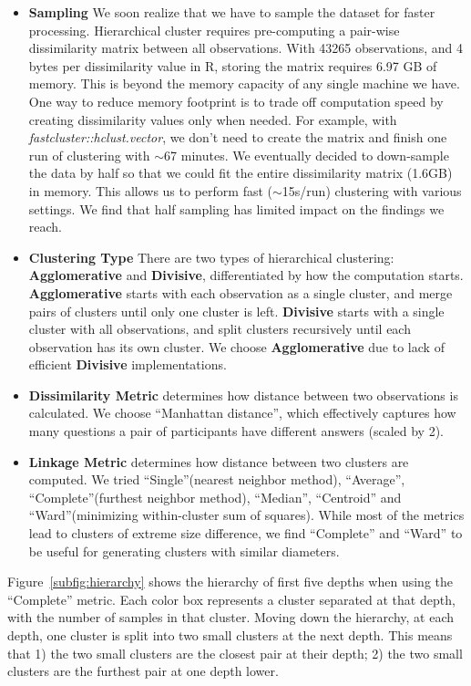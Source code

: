 \begin{itemize}
\item \textbf{Sampling} We soon realize that we have to sample the dataset for faster processing. Hierarchical cluster requires pre-computing a pair-wise dissimilarity matrix between all observations. With 43265 observations, and 4 bytes per dissimilarity value in R, storing the matrix requires 6.97 GB of memory. This is beyond the memory capacity of any single machine we have. One way to reduce memory footprint is to trade off computation speed by creating dissimilarity values only when needed. For example, with {\it fastcluster::hclust.vector}, we don't need to create the matrix and finish one run of clustering with $\sim$67 minutes. We eventually decided to down-sample the data by half so that we could fit the entire dissimilarity matrix (1.6GB) in memory. This allows us to perform fast ($\sim$15s/run) clustering with various settings. We find that half sampling has limited impact on the findings we reach.

\item \textbf{Clustering Type} There are two types of hierarchical clustering: \textbf{Agglomerative} and \textbf{Divisive}, differentiated by how the computation starts. \textbf{Agglomerative} starts with each observation as a single cluster, and merge pairs of clusters until only one cluster is left. \textbf{Divisive} starts with a single cluster with all observations, and split clusters recursively until each observation has its own cluster. We choose \textbf{Agglomerative} due to lack of efficient \textbf{Divisive} implementations. 

\item \textbf{Dissimilarity Metric} determines how distance between two observations is calculated. We choose ``Manhattan distance'', which effectively captures how many questions a pair of participants have different answers (scaled by 2).

\item \textbf{Linkage Metric} determines how distance between two clusters are computed. We tried ``Single''(nearest neighbor method), ``Average'', ``Complete''(furthest neighbor method), ``Median'', ``Centroid'' and ``Ward''(minimizing within-cluster sum of squares). While most of the metrics lead to clusters of extreme size difference, we find ``Complete'' and ``Ward'' to be useful for generating clusters with similar diameters. 
\end{itemize}

\qquad  Figure~\ref{subfig:hierarchy} shows the hierarchy of first five depths when using the ``Complete'' metric. Each color box represents a cluster separated at that depth, with the number of samples in that cluster. Moving down the hierarchy, at each depth, one cluster is split into two small clusters at the next depth. This means that 1) the two small clusters are the closest pair at their depth; 2) the two small clusters are the furthest pair at one depth lower. 

